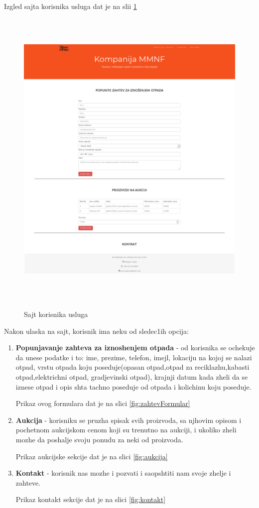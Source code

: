 \documentclass[10 pt]{article}
\begin{document}
	Izgled sajta korisnika usluga dat je na slii \ref{fig:StranaKorisnika}
	
		\begin{figure}[H]
			\centering
			\includegraphics[width=15cm,height=15cm,keepaspectratio]{GUI/stranaKorisnika.png}\\
			\caption{Sajt korisnika usluga}
			\label{fig:StranaKorisnika}
		\end{figure}
	
	Nakon ulaska na sajt, korisnik ima neku od sledec1ih opcija:
		\begin{enumerate}
			\item \textbf{Popunjavanje zahteva za iznoshenjem otpada} - od korisnika se ochekuje da unese podatke i to: ime, prezime, telefon, imejl, lokaciju na kojoj se nalazi otpad, vrstu otpada koju poseduje(opasan otpad,otpad za reciklazhu,kabasti otpad,elektrichni otpad, gradjevinski otpad), krajnji datum kada zheli da se iznese otpad i opis shta tachno poseduje od otpada i kolichinu koju poseduje.
			
			Prikaz ovog formulara dat je na slici \ref{fig:zahtevFormular}
			
			\item\textbf{ Aukcija} - korisniku se pruzha spisak svih proizvoda, sa njhovim opisom i pochetnom aukcijskom cenom koji su trenutno na aukciji, i ukoliko zheli mozhe da poshalje svoju ponudu za neki od proizvoda.
			
			Prikaz aukcijske sekcije dat je na slici \ref{fig:aukcija}
			
			\item \textbf{Kontakt} - korisnik nas mozhe i pozvati i saopshtiti nam svoje zhelje i zahteve.
			
			Prikaz kontakt sekcije dat je na slici \ref{fig:kontakt}
		\end{enumerate} 
	
\end{document}
